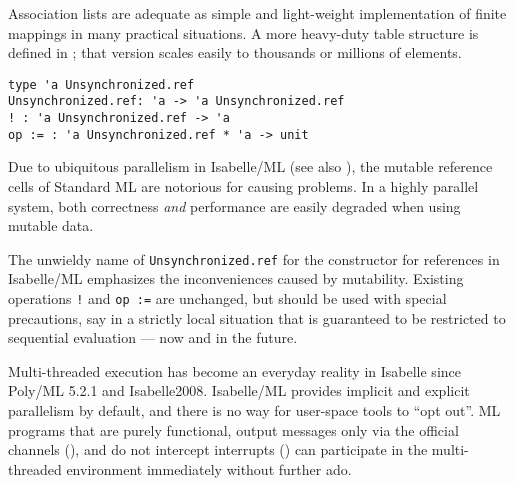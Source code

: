 \begin{isabellebody}
\begin{isamarkuptext}
  Association lists are adequate as simple and light-weight
  implementation of finite mappings in many practical situations.  A
  more heavy-duty table structure is defined in \hyperlink{file.~~/src/Pure/General/table.ML}{\mbox{}}; that version scales easily to
  thousands or millions of elements.%
\end{isamarkuptext}%
\isamarkuptrue%
%
\isamarkuptrue%
%
\isadelimmlref
%
\endisadelimmlref
%
\isatagmlref
%
\begin{isamarkuptext}%
\begin{mldecls}
  \verb|type 'a Unsynchronized.ref| \\
  \verb|Unsynchronized.ref: 'a -> 'a Unsynchronized.ref| \\
  \verb|! : 'a Unsynchronized.ref -> 'a| \\
  \verb|op := : 'a Unsynchronized.ref * 'a -> unit| \\
  \end{mldecls}%
\end{isamarkuptext}%
\isamarkuptrue%
%
\endisatagmlref
{\isafoldmlref}%
%
\isadelimmlref
%
\endisadelimmlref
%
\begin{isamarkuptext}%
Due to ubiquitous parallelism in Isabelle/ML (see also
  ), the mutable reference cells of
  Standard ML are notorious for causing problems.  In a highly
  parallel system, both correctness \emph{and} performance are easily
  degraded when using mutable data.

  The unwieldy name of \verb|Unsynchronized.ref| for the constructor
  for references in Isabelle/ML emphasizes the inconveniences caused by
  mutability.  Existing operations \verb|!|  and \verb|op :=| are
  unchanged, but should be used with special precautions, say in a
  strictly local situation that is guaranteed to be restricted to
  sequential evaluation --- now and in the future.%
\end{isamarkuptext}%
\isamarkuptrue%
%
\isamarkuptrue%
%
\begin{isamarkuptext}%
Multi-threaded execution has become an everyday reality in
  Isabelle since Poly/ML 5.2.1 and Isabelle2008.  Isabelle/ML provides
  implicit and explicit parallelism by default, and there is no way
  for user-space tools to ``opt out''.  ML programs that are purely
  functional, output messages only via the official channels
  (), and do not intercept interrupts
  () can participate in the multi-threaded
  environment immediately without further ado.


\end{isamarkuptext}
\end{isabellebody}
